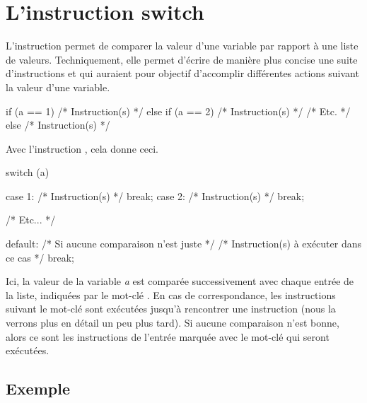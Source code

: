 \section{L'instruction switch}
\label{linstruction-switch}

L'instruction  permet de comparer la valeur d'une
variable par rapport à une liste de valeurs. Techniquement, elle permet
d'écrire de manière plus concise une suite d'instructions  et
 qui auraient pour objectif d'accomplir différentes actions
suivant la valeur d'une variable.

\begin{C}
if (a == 1)
{
    /* Instruction(s) */
}
else if (a == 2)
{
    /* Instruction(s) */
}
/* Etc. */
else
{
    /* Instruction(s) */
}
\end{C}

Avec l'instruction , cela donne ceci.

\begin{C}
switch (a)
{
case 1:
    /* Instruction(s) */
    break;
case 2:
    /* Instruction(s) */
    break;

/* Etc... */

default: /* Si aucune comparaison n'est juste */
    /* Instruction(s) à exécuter dans ce cas */
    break;
}
\end{C}

Ici, la valeur de la variable \emph{a} est comparée successivement avec
chaque entrée de la liste, indiquées par le mot-clé . En
cas de correspondance, les instructions suivant le mot-clé 
sont exécutées jusqu'à rencontrer une instruction  (nous
la verrons plus en détail un peu plus tard). Si aucune comparaison n'est
bonne, alors ce sont les instructions de l'entrée marquée avec le
mot-clé  qui seront exécutées.

\subsection{Exemple}
\label{exemple-4}

